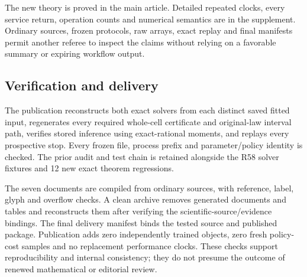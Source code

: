 \documentclass[ecta,nameyear,draft]{econsocart}
\begin{document}
The new theory is proved in the main article. Detailed repeated clocks,
every service return, operation counts and numerical semantics are in
the supplement. Ordinary sources, frozen protocols, raw arrays, exact
replay and final manifests permit another referee to inspect the claims
without relying on a favorable summary or expiring workflow output.

\hypertarget{verification-and-delivery}{%
\subsection{Verification and delivery}\label{verification-and-delivery}}

The publication reconstructs both exact solvers from each distinct saved
fitted input, regenerates every required whole-cell certificate and
original-law interval path, verifies stored inference using
exact-rational moments, and replays every prospective stop. Every frozen
file, process prefix and parameter/policy identity is checked. The prior
audit and test chain is retained alongside the R58 solver fixtures and
12 new exact theorem regressions.

The seven documents are compiled from ordinary sources, with reference,
label, glyph and overflow checks. A clean archive removes generated
documents and tables and reconstructs them after verifying the
scientific-source/evidence bindings. The final delivery manifest binds
the tested source and published package. Publication adds zero
independently trained objects, zero fresh policy-cost samples and no
replacement performance clocks. These checks support reproducibility and
internal consistency; they do not presume the outcome of renewed
mathematical or editorial review.
\end{document}
